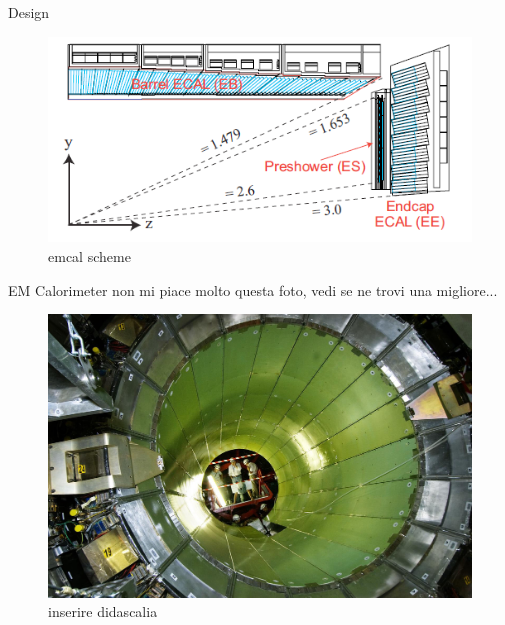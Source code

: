 \documentclass[10pt]{beamer}
\begin{document}
\begin{frame}{Design}
    \begin{figure}
        \centering
        \includegraphics[width=\textwidth]{./img/EMCal_Scheme.png}
        \caption{emcal scheme}
        \label{fig:emcalScheme}
    \end{figure}
\end{frame}

\begin{frame}[fragile]{EM Calorimeter}
  non mi piace molto questa foto, vedi se ne trovi una migliore...
  \begin{figure}
        \centering
        \includegraphics[width=.85\textwidth]{./img/ecal_barrel_photo.jpg}
        \caption{inserire didascalia}
        \label{fig:cms_barrel_photo}
    \end{figure}
\end{frame}
\end{document}
